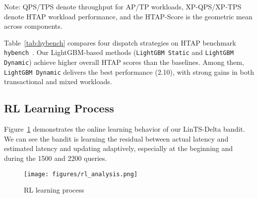 \documentclass[sigconf, nonacm]{acmart}
\begin{document}
\begin{table}[h]
  \centering
  \small
  \setlength{\tabcolsep}{4pt}
  \caption{Hybench Benchmark Results for Different Dispatch Strategies. }
  \vspace{-0.5em}
  \label{tab:hybench}
  \footnotesize{Note: QPS/TPS denote throughput for AP/TP workloads, XP-QPS/XP-TPS denote HTAP workload performance, and the HTAP-Score is the geometric mean across components.}
  \vspace{-1em}
\end{table}


Table~\ref{tab:hybench} compares four dispatch strategies on HTAP benchmark \texttt{hybench}~\cite{zhang2024hybench}. 
Our LightGBM-based methods (\texttt{LightGBM Static} and \texttt{LightGBM Dynamic}) achieve higher overall HTAP scores than the baselines. 
Among them, \texttt{LightGBM Dynamic} delivers the best performance (2.10), with strong gains in both transactional and mixed workloads.


\subsection{RL Learning Process}

Figure~\ref{fig:rl_learning} demonstrates the online learning behavior of our LinTS-Delta bandit. We can see the bandit is learning the residual between actual latency and estimated latency and updating adaptively, especially at the beginning and during the 1500 and 2200 queries.

\begin{figure}[h]
\centering
\texttt{[image: figures/rl\_analysis.png]}
\caption{RL learning process}
\label{fig:rl_learning}
\vspace{-1.5em}
\end{figure}
\end{document}
